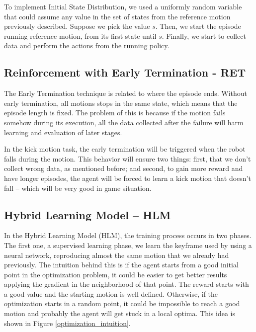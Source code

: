 To implement Initial State Distribution, we used a uniformly random variable that could assume any value in the set of states from the reference motion previously described. Suppose we pick the value $s$. Then, we start the episode running reference motion, from its first state until $s$. Finally, we start to collect data and perform the actions from the running policy.

\subsection{Reinforcement with Early Termination - RET}

The Early Termination technique is related to where the episode ends. Without early termination, all motions stops in the same state, which means that the episode length is fixed. The problem of this is because if the motion fails somehow during its execution, all the data collected after the failure will harm learning and evaluation of later stages.

In the kick motion task, the early termination will be triggered when the robot falls during the motion. This behavior will ensure two things: first, that we don't collect wrong data, as mentioned before; and second, to gain more reward and have longer episodes, the agent will be forced to learn a kick motion that doesn't fall -- which will be very good in game situation.

\subsection{Hybrid Learning Model -- HLM}
In the Hybrid Learning Model (HLM), the training process occurs in two phases. The first one, a supervised learning phase, we learn the keyframe used by using a neural network, reproducing almost the same motion that we already had previously. The intuition behind this is if the agent starts from a good initial point in the optimization problem, it could be easier to get better results applying the gradient in the neighborhood of that point. The reward starts with a good value and the starting motion is well defined. Otherwise, if the optimization starts in a random point, it could be impossible to reach a good motion and probably the agent will get stuck in a local optima. This idea is shown in Figure \ref{optimization_intuition}.

